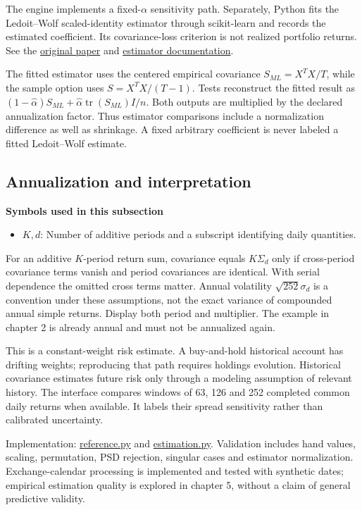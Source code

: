 \documentclass[
  american,
  11pt,
]{article}
\begin{document}
The engine implements a fixed-\(\alpha\) sensitivity path. Separately,
Python fits the Ledoit--Wolf scaled-identity estimator through
scikit-learn and records the estimated coefficient. Its covariance-loss
criterion is not realized portfolio returns. See the
\href{https://www.sciencedirect.com/science/article/pii/S0047259X03000964}{original
paper} and
\href{https://scikit-learn.org/stable/modules/generated/sklearn.covariance.LedoitWolf.html}{estimator
documentation}.

The fitted estimator uses the centered empirical covariance
\(S_{ML}=X^TX/T\), while the sample option uses \(S=X^TX/(T-1)\). Tests
reconstruct the fitted result as
\((1-\hat\alpha)S_{ML}+\hat\alpha\operatorname{tr}(S_{ML})I/n\). Both
outputs are multiplied by the declared annualization factor. Thus
estimator comparisons include a normalization difference as well as
shrinkage. A fixed arbitrary coefficient is never labeled a fitted
Ledoit--Wolf estimate.

\subsection{Annualization and
interpretation}\label{annualization-and-interpretation}

\textbf{Symbols used in this subsection}
\begin{itemize}
\item \(K,d\): Number of additive periods and a subscript identifying daily quantities.
\end{itemize}


For an additive \(K\)-period return sum, covariance equals \(K\Sigma_d\)
only if cross-period covariance terms vanish and period covariances are
identical. With serial dependence the omitted cross terms matter. Annual
volatility \(\sqrt{252}\sigma_d\) is a convention under these
assumptions, not the exact variance of compounded annual simple returns.
Display both period and multiplier. The example in chapter 2 is already
annual and must not be annualized again.

This is a constant-weight risk estimate. A buy-and-hold historical
account has drifting weights; reproducing that path requires holdings
evolution. Historical covariance estimates future risk only through a
modeling assumption of relevant history. The interface compares windows
of 63, 126 and 252 completed common daily returns when available. It
labels their spread sensitivity rather than calibrated uncertainty.

Implementation:
\href{https://github.com/eshangark/portfolio-risk-engine/blob/main/src/portfolio_risk/reference.py}{reference.py}
and
\href{https://github.com/eshangark/portfolio-risk-engine/blob/main/src/portfolio_risk/estimation.py}{estimation.py}.
Validation includes hand values, scaling, permutation, PSD rejection,
singular cases and estimator normalization. Exchange-calendar processing
is implemented and tested with synthetic dates; empirical estimation
quality is explored in chapter 5, without a claim of general predictive validity.
\end{document}
